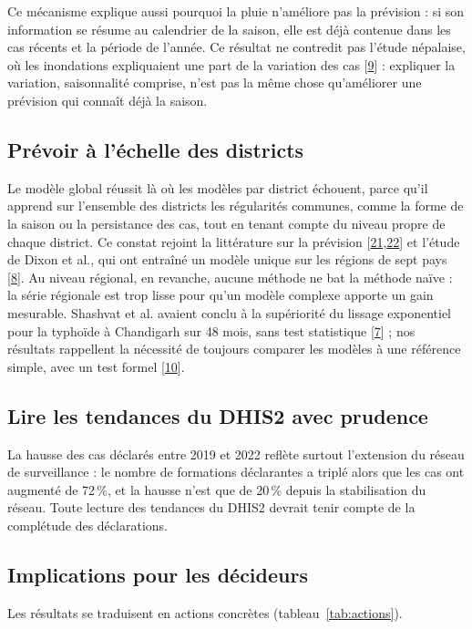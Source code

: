 \documentclass[11pt]{article}
\begin{document}
Ce mécanisme explique aussi pourquoi la pluie n'améliore pas la prévision : si son information se résume au calendrier de la saison, elle est déjà contenue dans les cas récents et la période de l'année. Ce résultat ne contredit pas l'étude népalaise, où les inondations expliquaient une part de la variation des cas [\hyperlink{ref9}{9}] : expliquer la variation, saisonnalité comprise, n'est pas la même chose qu'améliorer une prévision qui connaît déjà la saison.

\subsection{Prévoir à l'échelle des districts}
Le modèle global réussit là où les modèles par district échouent, parce qu'il apprend sur l'ensemble des districts les régularités communes, comme la forme de la saison ou la persistance des cas, tout en tenant compte du niveau propre de chaque district. Ce constat rejoint la littérature sur la prévision [\hyperlink{ref21}{21},\hyperlink{ref22}{22}] et l'étude de Dixon et al., qui ont entraîné un modèle unique sur les régions de sept pays [\hyperlink{ref8}{8}]. Au niveau régional, en revanche, aucune méthode ne bat la méthode naïve : la série régionale est trop lisse pour qu'un modèle complexe apporte un gain mesurable. Shashvat et al. avaient conclu à la supériorité du lissage exponentiel pour la typhoïde à Chandigarh sur 48 mois, sans test statistique [\hyperlink{ref7}{7}] ; nos résultats rappellent la nécessité de toujours comparer les modèles à une référence simple, avec un test formel [\hyperlink{ref10}{10}].

\subsection{Lire les tendances du DHIS2 avec prudence}
La hausse des cas déclarés entre 2019 et 2022 reflète surtout l'extension du réseau de surveillance : le nombre de formations déclarantes a triplé alors que les cas ont augmenté de 72\,\%, et la hausse n'est que de 20\,\% depuis la stabilisation du réseau. Toute lecture des tendances du DHIS2 devrait tenir compte de la complétude des déclarations.

\subsection{Implications pour les décideurs}
Les résultats se traduisent en actions concrètes (tableau~\ref{tab:actions}).
\end{document}
